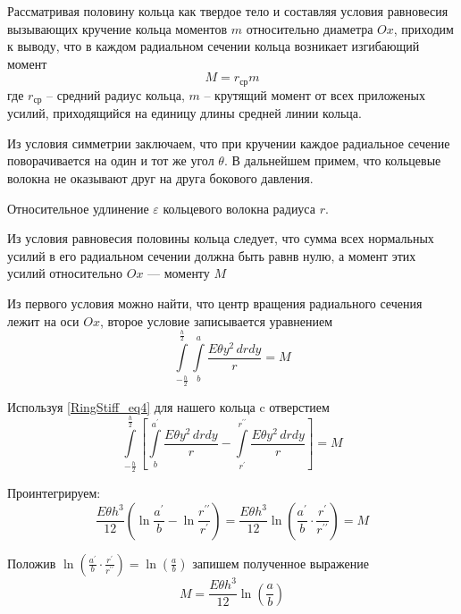 Рассматривая половину кольца как твердое тело и составляя условия равновесия вызывающих кручение кольца моментов $m$ относительно диаметра $Ox$, приходим к выводу, что в каждом радиальном сечении кольца возникает изгибающий момент 
\begin{equation}
  M = r_{\text{ср}}m
\end{equation}
где $r_{\text{ср}}$ -- средний радиус кольца, $m$ -- крутящий момент от всех приложеных усилий, приходящийся на единицу длины средней линии кольца. 

Из условия симметрии заключаем, что при кручении каждое радиальное сечение поворачивается на один и тот же угол $\theta$. В дальнейшем примем, что кольцевые волокна не оказывают друг на друга бокового давления.

Относительное удлинение $\varepsilon$ кольцевого волокна радиуса $r$.

Из условия равновесия половины кольца следует, что сумма всех нормальных усилий в его радиальном сечении должна быть равнв нулю, а момент этих усилий относительно $Ox$ --- моменту $M$

Из первого условия можно найти, что центр вращения радиального сечения лежит на оси $Ox$, второе условие записывается уравнением
\begin{equation}
  \label{RingStiff_eq4}
  \int\limits_{-\frac{h}{2}}^{\frac{h}{2}} \int\limits_b^a \frac{E \theta y^{2} \,drdy}{r}=M
\end{equation}

Используя \eqref{RingStiff_eq4} для нашего кольца c отверстием 
\begin{equation}
  \int\limits_{-\frac{h}{2}}^{\frac{h}{2}} \left [ \int\limits_{b}^{a^{\prime}} \frac{E \theta y^{2} \,drdy}{r} - \int\limits_{r^{\prime}}^{r^{\prime \prime}} \frac{E \theta y^{2} \,drdy}{r} \right ] = M
\end{equation}

Проинтегрируем:
\begin{equation}
  \frac{E \theta h^{3}}{12} \left ( \ln \frac{a^{\prime}}{b} - \ln \frac{r^{\prime \prime}}{r^{\prime}} \right ) = \frac{E \theta h^{3}}{12} \ln \left ( \frac{a^{\prime}}{b} \cdot \frac{r^{\prime}}{r^{\prime \prime}} \right ) = M
\end{equation}

Положив $\ln \left ( \frac{a^{\prime}}{b} \cdot \frac{r^{\prime}}{r^{\prime \prime}} \right ) = \ln \left ( \frac{a}{b} \right )$ запишем полученное выражение 
\begin{equation}
  M= \frac{E \theta h^{3}}{12} \ln \left ( \frac{a}{b} \right )
\end{equation}

